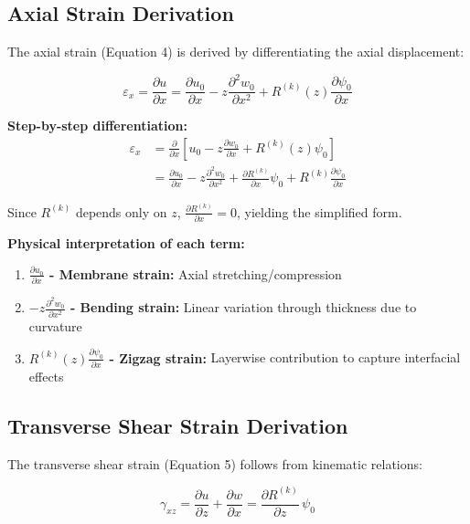 \documentclass[12pt,a4paper]{article}
\begin{document}
\subsection{Axial Strain Derivation}

The axial strain (Equation 4) is derived by differentiating the axial displacement:

\begin{equation}
\varepsilon_x = \frac{\partial u}{\partial x}
= \frac{\partial u_0}{\partial x}
- z \frac{\partial^2 w_0}{\partial x^2}
+ R^{(k)}(z) \frac{\partial \psi_0}{\partial x}
\end{equation}

\textbf{Step-by-step differentiation:}
\begin{align}
\varepsilon_x &= \frac{\partial}{\partial x} \left[ u_0 - z\frac{\partial w_0}{\partial x} + R^{(k)}(z)\psi_0 \right] \\
&= \frac{\partial u_0}{\partial x} - z\frac{\partial^2 w_0}{\partial x^2} + \frac{\partial R^{(k)}}{\partial x}\psi_0 + R^{(k)}\frac{\partial \psi_0}{\partial x}
\end{align}

Since $R^{(k)}$ depends only on $z$, $\frac{\partial R^{(k)}}{\partial x} = 0$, yielding the simplified form.

\textbf{Physical interpretation of each term:}
\begin{enumerate}
\item \textbf{$\frac{\partial u_0}{\partial x}$ - Membrane strain:} Axial stretching/compression
\item \textbf{$-z \frac{\partial^2 w_0}{\partial x^2}$ - Bending strain:} Linear variation through thickness due to curvature
\item \textbf{$R^{(k)}(z) \frac{\partial \psi_0}{\partial x}$ - Zigzag strain:} Layerwise contribution to capture interfacial effects
\end{enumerate}

\subsection{Transverse Shear Strain Derivation}

The transverse shear strain (Equation 5) follows from kinematic relations:

\begin{equation}
\gamma_{xz} = \frac{\partial u}{\partial z} + \frac{\partial w}{\partial x}
= \frac{\partial R^{(k)}}{\partial z} \, \psi_0
\end{equation}
\end{document}
